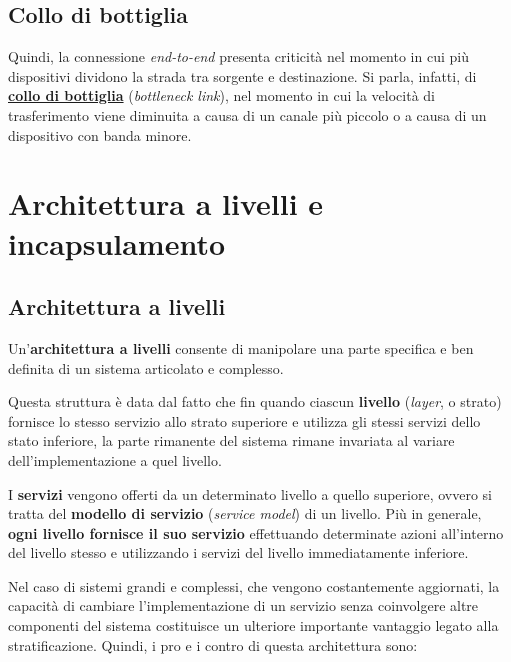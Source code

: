 \documentclass[a4paper]{article}
\begin{document}
	\subsection{Collo di bottiglia}

	\noindent
	Quindi, la connessione \emph{end-to-end} presenta criticità nel momento in cui più dispositivi dividono la strada tra sorgente e destinazione. Si parla, infatti, di \textcolor{Red3}{\textbf{\underline{collo di bottiglia}}} (\emph{bottleneck link}), nel momento in cui la velocità di trasferimento viene diminuita a causa di un canale più piccolo o a causa di un dispositivo con banda minore.
	
	\newpage
	
	\section{Architettura a livelli e incapsulamento}
	
	\subsection{Architettura a livelli}
	
	Un'\textcolor{Red3}{\textbf{architettura a livelli}} consente di manipolare una parte specifica e ben definita di un sistema articolato e complesso.\newline
	
	\noindent
	Questa struttura è data dal fatto che fin quando ciascun \textbf{livello} (\emph{layer}, o strato) fornisce lo stesso servizio allo strato superiore e utilizza gli stessi servizi dello stato inferiore, la parte rimanente del sistema rimane invariata al variare dell'implementazione a quel livello.\newline
	
	\noindent
	I \textbf{servizi} vengono offerti da un determinato livello a quello superiore, ovvero si tratta del \textbf{modello di servizio} (\emph{service model}) di un livello. Più in generale, \textbf{ogni livello fornisce il suo servizio} effettuando determinate azioni all'interno del livello stesso e utilizzando i servizi del livello immediatamente inferiore.\newline
	
	\noindent
	Nel caso di sistemi grandi e complessi, che vengono costantemente aggiornati, la capacità di cambiare l'implementazione di un servizio senza coinvolgere altre componenti del sistema costituisce un ulteriore importante vantaggio legato alla stratificazione. Quindi, i pro e i contro di questa architettura sono:
	
\end{document}
